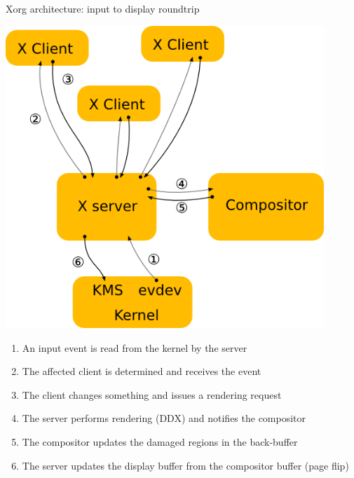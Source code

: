 \begin{frame}{Xorg architecture: input to display roundtrip}
  \begin{minipage}{0.49\textwidth}
    \centering
    \includegraphics[width=0.9\textwidth]{slides/graphics-software/x-architecture-roundtrip.png}
  \end{minipage}
  \hfill
  \begin{minipage}{0.49\textwidth}
    \begin{enumerate}
    \item An input event is read from the kernel by the server
    \item The affected client is determined and receives the event
    \item The client changes something and issues a rendering request
    \item The server performs rendering (DDX) and notifies the compositor
    \item The compositor updates the damaged regions in the back-buffer
    \item The server updates the display buffer from the compositor buffer (page flip)
    \end{enumerate}
  \end{minipage}
\end{frame}

